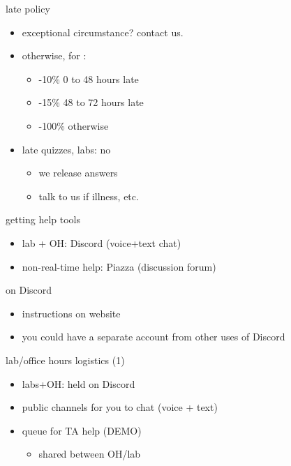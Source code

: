\begin{frame}{late policy}
    \begin{itemize}
    \item exceptional circumstance? contact us.
    \item otherwise, for :
        \begin{itemize}
        \item -10\% 0 to 48 hours late
        \item -15\% 48 to 72 hours late
        \item -100\% otherwise
        \end{itemize}
    \item late quizzes, labs: no
        \begin{itemize}
        \item we release answers
        \item talk to us if illness, etc.
        \end{itemize}
    \end{itemize}
\end{frame}

\begin{frame}{getting help tools}
    \begin{itemize}
    \item lab + OH: Discord (voice+text chat)
    \item non-real-time help: Piazza (discussion forum)
    \end{itemize}
\end{frame}

\begin{frame}{on Discord}
    \begin{itemize}
    \item instructions on website
    \vspace{.5cm}
    \item you could have a separate account from other uses of Discord
    \end{itemize}
\end{frame}

\begin{frame}{lab/office hours logistics (1)}
    \begin{itemize}
    \item labs+OH: held on Discord
    \item public channels for you to chat (voice + text)
    \item queue for TA help (DEMO)
        \begin{itemize}
        \item shared between OH/lab
        \end{itemize}
    \end{itemize}
\end{frame}

